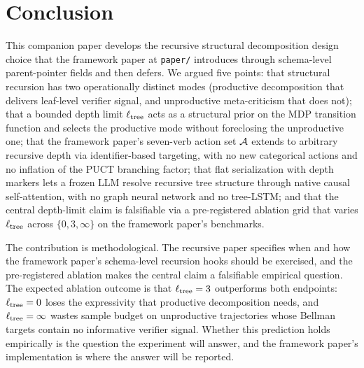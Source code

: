 \section{Conclusion}
\label{sec:conclusion}

This companion paper develops the recursive structural decomposition
design choice that the framework paper at \texttt{paper/} introduces
through schema-level parent-pointer fields and then defers. We argued
five points: that structural recursion has two operationally distinct
modes (productive decomposition that delivers leaf-level verifier signal,
and unproductive meta-criticism that does not); that a bounded depth
limit $\ell_{\mathrm{tree}}$ acts as a structural prior on the MDP transition
function and selects the productive mode without foreclosing the
unproductive one; that the framework paper's seven-verb action set
$\mathcal{A}$ extends to arbitrary recursive depth via identifier-based
targeting, with no new categorical actions and no inflation of the PUCT
branching factor; that flat serialization with depth markers lets a
frozen LLM resolve recursive tree structure through native causal
self-attention, with no graph neural network and no tree-LSTM; and that
the central depth-limit claim is falsifiable via a pre-registered
ablation grid that varies $\ell_{\mathrm{tree}}$ across $\{0, 3, \infty\}$ on the
framework paper's benchmarks.

The contribution is methodological. The recursive paper specifies when
and how the framework paper's schema-level recursion hooks should be
exercised, and the pre-registered ablation makes the central claim a
falsifiable empirical question. The expected ablation outcome is that
$\ell_{\mathrm{tree}} = 3$ outperforms both endpoints: $\ell_{\mathrm{tree}} = 0$ loses the
expressivity that productive decomposition needs, and $\ell_{\mathrm{tree}} =
\infty$ wastes sample budget on unproductive trajectories whose Bellman
targets contain no informative verifier signal. Whether this prediction
holds empirically is the question the experiment will answer, and the
framework paper's implementation is where the answer will be reported.
